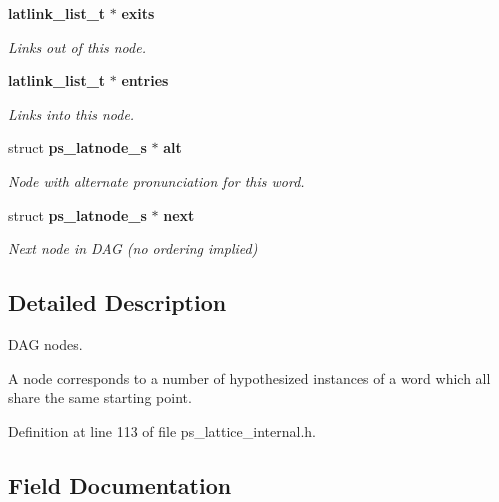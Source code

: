 \begin{DoxyCompactItemize}
\begin{tabbing}
\end{tabbing}\item 
\mbox{\label{structps__latnode__s_a5232eefbc6e800b77e7a3c8ee3f4135d}} 
\textbf{ latlink\+\_\+list\+\_\+t} $\ast$ \textbf{ exits}
\begin{DoxyCompactList}\small\item\em Links out of this node. \end{DoxyCompactList}\item 
\mbox{\label{structps__latnode__s_a051a7eed31e29dd75151d1b34cc4eefa}} 
\textbf{ latlink\+\_\+list\+\_\+t} $\ast$ \textbf{ entries}
\begin{DoxyCompactList}\small\item\em Links into this node. \end{DoxyCompactList}\item 
\mbox{\label{structps__latnode__s_aa4c0a395c74acbacccde561f92fa89e4}} 
struct \textbf{ ps\+\_\+latnode\+\_\+s} $\ast$ \textbf{ alt}
\begin{DoxyCompactList}\small\item\em Node with alternate pronunciation for this word. \end{DoxyCompactList}\item 
\mbox{\label{structps__latnode__s_aca6f3d543a1712a1ca3bb8ec60f71c84}} 
struct \textbf{ ps\+\_\+latnode\+\_\+s} $\ast$ \textbf{ next}
\begin{DoxyCompactList}\small\item\em Next node in D\+AG (no ordering implied) \end{DoxyCompactList}\end{DoxyCompactItemize}


\subsection{Detailed Description}
D\+AG nodes. 

A node corresponds to a number of hypothesized instances of a word which all share the same starting point. 

Definition at line 113 of file ps\+\_\+lattice\+\_\+internal.\+h.



\subsection{Field Documentation}
\mbox{\label{structps__latnode__s_af9c4c69f5f85bbc36818357a52432565}} 
